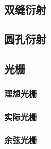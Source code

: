 \documentclass{article}
\begin{document}
\subsection{双缝衍射}
\subsection{圆孔衍射}
\subsection{光栅}
\subsubsection{理想光栅}
\subsubsection{实际光栅}
\subsubsection{余弦光栅}
\end{document}
